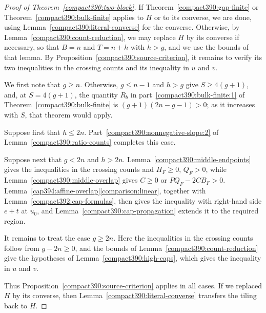 \begin{proof}[Proof of Theorem~\ref{compact390:two-block}]
If Theorem~\ref{compact390:gap-finite} or Theorem~\ref{compact390:bulk-finite} applies to $H$ or to its converse, we are done, using Lemma~\ref{compact390:literal-converse} for the converse. Otherwise, by Lemma~\ref{compact390:count-reduction}, we may replace $H$ by its converse if necessary, so that $B=n$ and $T=n+h$ with $h>g$, and we use the bounds of that lemma. By Proposition~\ref{compact390:source-criterion}, it remains to verify its two inequalities in the crossing counts and its inequality in $u$ and $v$.

We first note that $g\ge n$. Otherwise, $g\le n-1$ and $h>g$ give $S\ge4(g+1)$, and,
at $S=4(g+1)$, the quantity $R_b$ in part~\ref{compact390:bulk-finite:1} of Theorem~\ref{compact390:bulk-finite} is $(g+1)(2n-g-1)>0$; as it increases with $S$, that theorem would apply.

Suppose first that $h\le2n$.
Part~\ref{compact390:nonnegative-slope:2} of Lemma~\ref{compact390:ratio-counts} completes this case.

Suppose next that $g<2n$ and $h>2n$. Lemma~\ref{compact390:middle-endpoints}
gives the inequalities in the crossing counts and $H_F\ge0$, $Q_F>0$,
while
Lemma~\ref{compact390:middle-overlap} gives $C\ge0$ or
$PQ_F-2CB_F>0$.
Lemma~\ref{cap394:affine-overlap}\ref{comparison:linear}, together with Lemma~\ref{compact392:cap-formulas}, then gives the inequality with right-hand side $e+t$ at $u_0$, and
Lemma~\ref{compact390:cap-propagation} extends it to the required region.

It remains to treat the case $g\ge2n$. Here the inequalities in the crossing counts follow
from $g-2n\ge0$, and the bounds of Lemma~\ref{compact390:count-reduction} give the hypotheses
of Lemma~\ref{compact390:high-caps}, which gives the inequality in $u$ and $v$.

Thus Proposition~\ref{compact390:source-criterion} applies in all cases. If we replaced $H$ by its converse, then Lemma~\ref{compact390:literal-converse} transfers the tiling back to $H$.
\end{proof}


